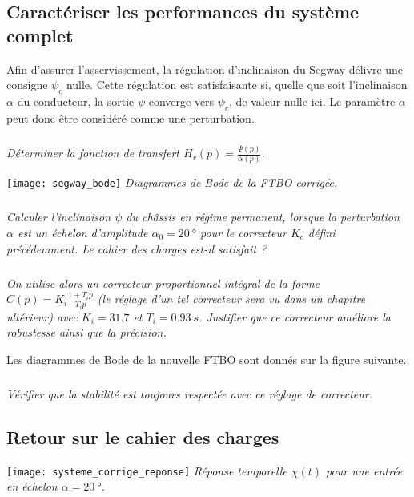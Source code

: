 \begin{multicols}{2}


\subsection*{Caractériser les performances du système complet}

Afin d'assurer l'asservissement, la régulation d'inclinaison du Segway\textregistered{} délivre une consigne $\psi_c$ nulle.  Cette régulation est satisfaisante si, quelle que soit l'inclinaison $\alpha$ du conducteur, la sortie $\psi$ converge vers $\psi_c$, de valeur nulle ici.  Le paramètre $\alpha$ peut donc être considéré comme une perturbation.



\subparagraph{}\textit{Déterminer la fonction de transfert $H_r(p)=\frac{\Psi(p)}{\alpha(p)}$.}

\begin{center}%
\texttt{[image: segway\_bode]}
\textit{Diagrammes de Bode de la FTBO corrigée.} \label{ex_Segway_bode}
\end{center}%

\subparagraph{}\textit{Calculer l'inclinaison $\psi$ du châssis en régime permanent, lorsque la perturbation $\alpha$ est un échelon d'amplitude $\alpha_0=\SI{20}{\degree}$ pour le correcteur $K_c$ défini précédemment. Le cahier des charges est-il satisfait ?}

\subparagraph{}\textit{On utilise alors un correcteur proportionnel intégral de la forme $C(p)=K_i \frac{1+T_i p}{T_i p}$ (le réglage d'un tel correcteur sera vu dans un chapitre ultérieur) avec $K_i=\num{31.7}$ et $T_i=\SI{0.93}{s}$. Justifier que ce correcteur améliore la robustesse ainsi que la précision.}

Les diagrammes de Bode de la nouvelle FTBO sont donnés sur la figure suivante.%


\subparagraph{}\textit{Vérifier que la stabilité est toujours respectée avec ce réglage de correcteur.}



\subsection*{Retour sur le cahier des charges}
\begin{center}
\texttt{[image: systeme\_corrige\_reponse]}
\textit{Réponse temporelle $\chi(t)$ pour une entrée en échelon $\alpha=\SI{20}{\degree}$.}
\label{ex_segway_reponse_temporelle}
\end{center}





\end{multicols}
